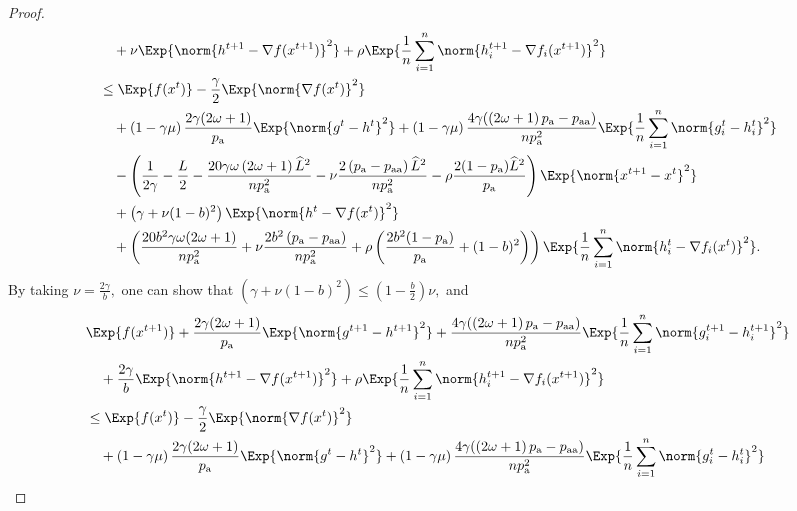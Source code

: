 \documentclass{article}
\newcommand*{\probavailable}{\ensuremath{p_{\textnormal{a}}}}
\newcommand*{\probpairaa}{\ensuremath{p_{\textnormal{aa}}}}
\begin{document}
\begin{proof}
\begin{align*}
      &\quad  + \nu \Exp{\norm{h^{t+1} - \nabla f(x^{t+1})}^2} + \rho \Exp{\frac{1}{n}\sum_{i=1}^n\norm{h^{t+1}_i - \nabla f_i(x^{t+1})}^2}\\
      &\leq \Exp{f(x^t)} - \frac{\gamma}{2}\Exp{\norm{\nabla f(x^t)}^2} \\
      &\quad + \left(1 - \gamma \mu\right)\frac{2\gamma(2\omega + 1)}{\probavailable}\Exp{\norm{g^{t} - h^t}^2} + \left(1 - \gamma \mu\right)\frac{4 \gamma (\left(2 \omega + 1\right)\probavailable - \probpairaa)}{n \probavailable^2}\Exp{\frac{1}{n} \sum_{i=1}^n\norm{g^t_i - h^{t}_i}^2} \\
      &\quad - \left(\frac{1}{2\gamma} - \frac{L}{2} - \frac{20 \gamma \omega \left(2 \omega + 1\right) \widehat{L}^2}{n \probavailable^2} - \nu \frac{2\left(\probavailable - \probpairaa\right)\widehat{L}^2}{n \probavailable^2} - \rho \frac{2(1 - \probavailable) \widehat{L}^2}{\probavailable} \right) \Exp{\norm{x^{t+1} - x^t}^2} \\
      &\quad + \left(\gamma + \nu (1 - b)^2\right) \Exp{\norm{h^{t} - \nabla f(x^{t})}^2} \\
      &\quad + \left(\frac{20 b^2 \gamma \omega (2 \omega + 1)}{n \probavailable^2} + \nu \frac{2 b^2 \left(\probavailable - \probpairaa\right)}{n \probavailable^2} + \rho \left(\frac{2 b^2 (1 - \probavailable)}{\probavailable} + (1 - b)^2\right) \right)\Exp{\frac{1}{n}\sum_{i=1}^n\norm{h^{t}_i - \nabla f_i(x^{t})}^2}.
    \end{align*}
    By taking $\nu = \frac{2\gamma}{b},$ one can show that $\left(\gamma + \nu (1 - b)^2\right) \leq \left(1 - \frac{b}{2}\right)\nu,$ and
    \begin{align*}
      &\Exp{f(x^{t + 1})} + \frac{2\gamma (2\omega + 1)}{\probavailable} \Exp{\norm{g^{t+1} - h^{t+1}}^2} + \frac{4 \gamma (\left(2 \omega + 1\right)\probavailable - \probpairaa)}{n \probavailable^2} \Exp{\frac{1}{n}\sum_{i=1}^n\norm{g^{t+1}_i - h^{t+1}_i}^2}\\
      &\quad  + \frac{2\gamma}{b} \Exp{\norm{h^{t+1} - \nabla f(x^{t+1})}^2} + \rho \Exp{\frac{1}{n}\sum_{i=1}^n\norm{h^{t+1}_i - \nabla f_i(x^{t+1})}^2}\\
      &\leq \Exp{f(x^t)} - \frac{\gamma}{2}\Exp{\norm{\nabla f(x^t)}^2} \\
      &\quad + \left(1 - \gamma \mu\right)\frac{2\gamma(2\omega + 1)}{\probavailable}\Exp{\norm{g^{t} - h^t}^2} + \left(1 - \gamma \mu\right)\frac{4 \gamma (\left(2 \omega + 1\right)\probavailable - \probpairaa)}{n \probavailable^2}\Exp{\frac{1}{n} \sum_{i=1}^n\norm{g^t_i - h^{t}_i}^2} \\

\end{align*}
\end{proof}
\end{document}

